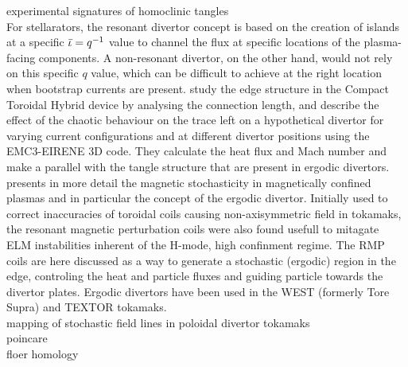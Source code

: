experimental signatures of homoclinic tangles \cite{evans_experimental_2005}
\\[10pt]
For stellarators, the resonant divertor concept is based on the creation of islands at a specific $\Bar{\iota} = q^{-1}$ value to channel the flux at specific locations of the plasma-facing components. A non-resonant divertor, on the other hand, would not rely on this specific $q$ value, which can be difficult to achieve at the right location when bootstrap currents are present. \cite{garcia_exploration_2023} study the edge structure in the Compact Toroidal Hybrid device by analysing the connection length, and describe the effect of the chaotic behaviour on the trace left on a hypothetical divertor for varying current configurations and at different divertor positions using the EMC3-EIRENE 3D code. They calculate the heat flux and Mach number and make a parallel with the tangle structure that are present in ergodic divertors.
\\[10pt]
\cite{abdullaev_magnetic_2014} presents in more detail the magnetic stochasticity in magnetically confined plasmas and in particular the concept of the ergodic divertor. Initially used to correct inaccuracies of toroidal coils causing non-axisymmetric field in tokamaks, the resonant magnetic perturbation coils were also found usefull to mitagate ELM instabilities inherent of the H-mode, high confinment regime. The RMP coils are here discussed as a way to generate a stochastic (ergodic) region in the edge, controling the heat and particle fluxes and guiding particle towards the divertor plates. Ergodic divertors have been used in the WEST (formerly Tore Supra) and TEXTOR tokamaks.
\\[10pt]
mapping of stochastic field lines in poloidal divertor tokamaks \cite{abdullaev_mappings_2006}
\\[10pt]
poincare \cite{poincare_methodes_1892}
\\[10pt]
floer homology \cite{hohloch_homoclinic_2017}\cite{hohloch_transport_2012}

